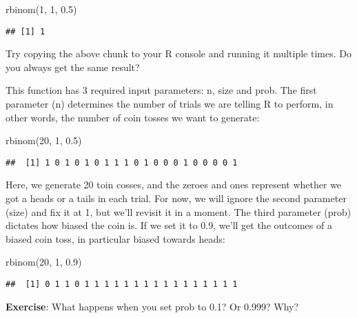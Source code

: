 \documentclass[
]{book}
\newenvironment{Shaded}{\begin{snugshade}}{\end{snugshade}}
\newcommand{\DecValTok}[1]{\textcolor[rgb]{0.00,0.00,0.81}{#1}}
\newcommand{\FloatTok}[1]{\textcolor[rgb]{0.00,0.00,0.81}{#1}}
\newcommand{\FunctionTok}[1]{\textcolor[rgb]{0.00,0.00,0.00}{#1}}
\newcommand{\NormalTok}[1]{#1}
\begin{document}
\begin{Shaded}
\begin{Highlighting}[]
\FunctionTok{rbinom}\NormalTok{(}\DecValTok{1}\NormalTok{, }\DecValTok{1}\NormalTok{, }\FloatTok{0.5}\NormalTok{)}
\end{Highlighting}
\end{Shaded}

\begin{verbatim}
## [1] 1
\end{verbatim}

Try copying the above chunk to your R console and running it multiple times. Do you always get the same result?

This function has 3 required input parameters: n, size and prob. The first parameter (n) determines the number of trials we are telling R to perform, in other words, the number of coin tosses we want to generate:

\begin{Shaded}
\begin{Highlighting}[]
\FunctionTok{rbinom}\NormalTok{(}\DecValTok{20}\NormalTok{, }\DecValTok{1}\NormalTok{, }\FloatTok{0.5}\NormalTok{)}
\end{Highlighting}
\end{Shaded}

\begin{verbatim}
##  [1] 1 0 1 0 1 0 1 1 1 0 1 0 0 0 1 0 0 0 0 1
\end{verbatim}

Here, we generate 20 toin cosses, and the zeroes and ones represent whether we got a heads or a tails in each trial. For now, we will ignore the second parameter (size) and fix it at 1, but we'll revisit it in a moment. The third parameter (prob) dictates how biased the coin is. If we set it to 0.9, we'll get the outcomes of a biased coin toss, in particular biased towards heads:

\begin{Shaded}
\begin{Highlighting}[]
\FunctionTok{rbinom}\NormalTok{(}\DecValTok{20}\NormalTok{, }\DecValTok{1}\NormalTok{, }\FloatTok{0.9}\NormalTok{)}
\end{Highlighting}
\end{Shaded}

\begin{verbatim}
##  [1] 0 1 1 0 1 1 1 1 1 1 1 1 1 1 1 1 1 1 1 1
\end{verbatim}

\textbf{Exercise}: What happens when you set prob to 0.1? Or 0.999? Why?
\end{document}
